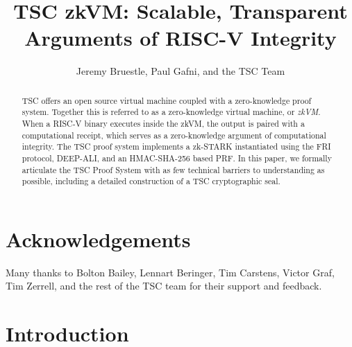 \documentclass[10pt,letterpaper,titlepage]{article}
\author{Jeremy Bruestle, Paul Gafni, and the TSC Team}
\title{TSC zkVM: Scalable, Transparent Arguments of RISC-V Integrity}
\theoremstyle{definition}
\begin{document}
\maketitle
\begin{abstract}
TSC offers an open source virtual machine coupled with a zero-knowledge proof system.
Together this is referred to as a zero-knowledge virtual machine, or \textit{zkVM}.
When a RISC-V binary executes inside the zkVM, the output is paired with a computational receipt, which serves as a zero-knowledge argument of computational integrity.
The TSC proof system implements a zk-STARK instantiated using the FRI protocol, DEEP-ALI, and an HMAC-SHA-256 based PRF. 
In this paper, we formally articulate the TSC Proof System with as few technical barriers to understanding as possible, including a detailed construction of a TSC cryptographic seal.
\end{abstract}

\tableofcontents

\section*{Acknowledgements}
Many thanks to Bolton Bailey, Lennart Beringer, Tim Carstens, Victor Graf, Tim Zerrell, and the rest of the TSC team for their support and feedback. 

\clearpage

\section{Introduction}
\label{introduction}
\end{document}
